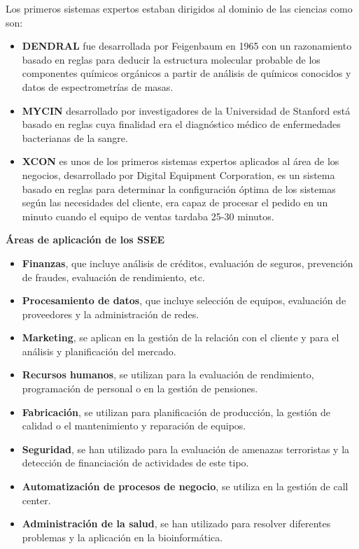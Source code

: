 \documentclass[12pt, twoside, openright]{report} %
\begin{document}
Los primeros sistemas expertos estaban dirigidos al dominio de las ciencias como son:
\begin{itemize}
	\item \textbf{DENDRAL} fue desarrollada por Feigenbaum en 1965 con un razonamiento basado en reglas para deducir la estructura molecular probable de los componentes químicos orgánicos a partir de análisis de químicos conocidos y datos de espectrometrías de masas.
	\item \textbf{MYCIN} desarrollado por investigadores de la Universidad de Stanford está basado en reglas cuya finalidad era el diagnóstico médico de enfermedades bacterianas de la sangre.
	\item \textbf{XCON} es unos de los primeros sistemas expertos aplicados al área de los negocios, desarrollado por Digital Equipment Corporation, es un sistema basado en reglas para determinar la configuración óptima de los sistemas según las necesidades del cliente, era capaz de procesar el pedido en un minuto cuando el equipo de ventas tardaba 25-30 minutos.
\end{itemize}

\textbf{Áreas de aplicación de los SSEE}
\begin{itemize}
	\item \textbf{Finanzas}, que incluye análisis de créditos, evaluación de seguros, prevención de fraudes, evaluación de rendimiento, etc.
	\item \textbf{Procesamiento de datos}, que incluye selección de equipos, evaluación de proveedores y la administración de redes.
	\item \textbf{Marketing}, se aplican en la gestión de la relación con el cliente y para el análisis y planificación del mercado.
	\item \textbf{Recursos humanos}, se utilizan para la evaluación de rendimiento, programación de personal o en la gestión de pensiones.
	\item \textbf{Fabricación}, se utilizan para planificación de producción, la gestión de calidad o el mantenimiento y reparación de equipos.
	\item \textbf{Seguridad}, se han utilizado para la evaluación de amenazas terroristas y la detección de financiación de actividades de este tipo.
	\item \textbf{Automatización de procesos de negocio}, se utiliza en la gestión de call center.
	\item \textbf{Administración de la salud}, se han utilizado para resolver diferentes problemas y la aplicación en la bioinformática.
\end{itemize}
\pagebreak
\end{document}
